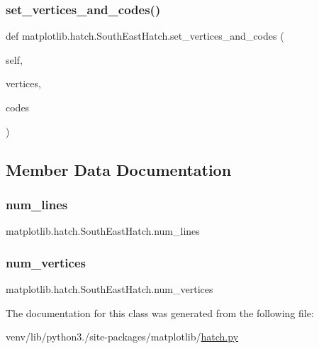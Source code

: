 \subsubsection{\texorpdfstring{set\+\_\+vertices\+\_\+and\+\_\+codes()}{set\_vertices\_and\_codes()}}
{\footnotesize\ttfamily def matplotlib.\+hatch.\+South\+East\+Hatch.\+set\+\_\+vertices\+\_\+and\+\_\+codes (\begin{DoxyParamCaption}\item[{}]{self,  }\item[{}]{vertices,  }\item[{}]{codes }\end{DoxyParamCaption})}



\subsection{Member Data Documentation}
\mbox{\label{classmatplotlib_1_1hatch_1_1SouthEastHatch_ae0166b18c0cb539f454070729a0a9fd0}} 
\subsubsection{\texorpdfstring{num\+\_\+lines}{num\_lines}}
{\footnotesize\ttfamily matplotlib.\+hatch.\+South\+East\+Hatch.\+num\+\_\+lines}

\mbox{\label{classmatplotlib_1_1hatch_1_1SouthEastHatch_a0dbb69cb359e3ec590cff12b79140af2}} 
\subsubsection{\texorpdfstring{num\+\_\+vertices}{num\_vertices}}
{\footnotesize\ttfamily matplotlib.\+hatch.\+South\+East\+Hatch.\+num\+\_\+vertices}



The documentation for this class was generated from the following file\+:\begin{DoxyCompactItemize}
\item 
venv/lib/python3./site-\/packages/matplotlib/\hyperlink{hatch_8py}{hatch.\+py}\end{DoxyCompactItemize}
